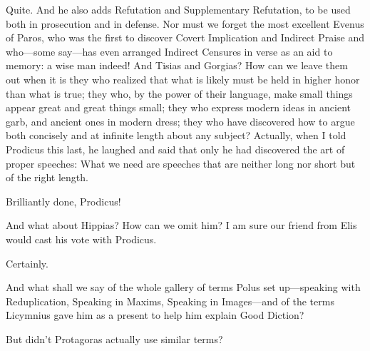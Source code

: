 \saysocrates Quite. And he also adds Refutation and Supplementary
Refutation, to be used both in prosecution and in
defense. Nor must we forget the most excellent Evenus of
Paros, who was the
first to discover Covert Implication and Indirect Praise and who---some
say---has even arranged Indirect Censures in verse as an aid to memory:
a wise man indeed! And
Tisias 
and Gorgias?
How can we leave them out when it is they who realized that what is
likely must be held in higher honor than what is true; they who, by the
power of their language, make small things appear great and great things
small; they who express modern ideas in ancient garb, and
ancient ones in modern dress; they who have discovered how to argue both
concisely and at infinite length about any subject? Actually, when I
told Prodicus this
last, he laughed and said that only he had discovered the art of proper
speeches: What we need are speeches that are neither long nor short but
of the right length.

\sayphaedrus Brilliantly done, Prodicus!

\saysocrates And what about
Hippias? How can we
omit him? I am sure our friend from Elis would cast his vote with
Prodicus.

\sayphaedrus Certainly.

\saysocrates And what shall we say of the whole gallery of terms
Polus set
up---speaking with Reduplication, Speaking in Maxims, Speaking in
Images---and of the terms Licymnius gave him as a present to help him
explain Good Diction?

\sayphaedrus But didn't Protagoras actually use similar
terms?

